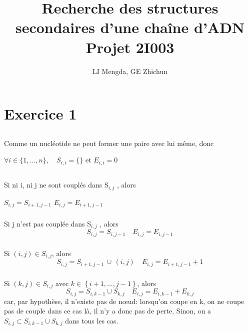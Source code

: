 \documentclass[french]{article}
\title{Recherche des structures secondaires d’une chaîne d’ADN\\
\large Projet 2I003}
\author{LI Mengda, GE Zhichun}
\begin{document}
\lstset{language=Python}	

\maketitle

\section{Exercice 1}

\subsection{}
\label{subsec:q1}
Comme un nucléotide ne peut former une paire avec lui même, donc 

\begin{center}
$\forall i\in\{1,...,n\}, \quad S_{i,i} = \{\}$ et $ E_{i,i} = 0$
\par\end{center}

\subsection{}
\label{subsec:q2}

	\subsubsection{}
	Si ni i, ni j ne sont couplés dans S$_{i,j}$ , alors
	\begin{center}
	$S_{i,j} = S_{i+1,j-1}$ \quad $E_{i,j} = E_{i+1,j-1}$
	\par\end{center}

	\subsubsection{}
	Si j n'est pas couplée dans S$_{i,j}$ , alors
	\[
	S_{i,j} = S_{i,j-1} \quad E_{i,j} = E_{i,j-1}
	\]

	\subsubsection{}
	Si $\left(i,j\right)\in S_{i,j}$, alors
	\[
	S_{i,j}   = S_{i+1,j-1}\, \cup \, \left(i,j\right) \quad  E_{i,j} = E_{i+1,j-1}+ 1
	\]

	\subsubsection{}
	Si $\left(k,j\right)\in S_{i,j}$ avec $k\in\left\{ i+1,...,j-1\right\} $, alors
	\[
	S_{i,j}= S_{i,k-1}\cup S_{k,j} \quad E_{i,j} = E_{i,k-1} + E_{k,j} 
	\]
	car, par hypothèse, il n'existe pas de nœud: lorsqu'on coupe en k, on ne coupe pas de couple dans ce cas là, il n'y a donc pas de perte. Sinon, on a $S_{i,j} \subset S_{i,k-1}\cup S_{k,j} $ dans tous les cas.
\end{document}
